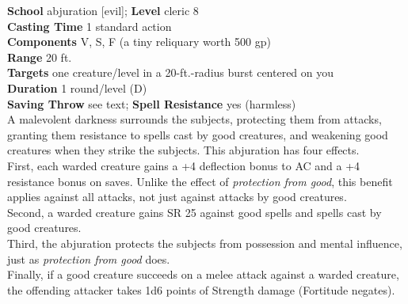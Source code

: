 \textbf{School} abjuration [evil]; \textbf{Level} cleric 8\\
\textbf{Casting Time} 1 standard action\\
\textbf{Components} V, S, F (a tiny reliquary worth 500 gp)\\
\textbf{Range} 20 ft.\\
\textbf{Targets} one creature/level in a 20-ft.-radius burst centered on you\\
\textbf{Duration} 1 round/level (D)\\
\textbf{Saving Throw} see text; \textbf{Spell Resistance} yes (harmless)\\
A malevolent darkness surrounds the subjects, protecting them from attacks, granting them resistance to spells cast by good creatures, and weakening good creatures when they strike the subjects. This abjuration has four effects.\\
First, each warded creature gains a +4 deflection bonus to AC and a +4 resistance bonus on saves. Unlike the effect of \textit{protection from good}, this benefit applies against all attacks, not just against attacks by good creatures.\\
Second, a warded creature gains SR 25 against good spells and spells cast by good creatures.\\
Third, the abjuration protects the subjects from possession and mental influence, just as \textit{protection from good }does.\\
Finally, if a good creature succeeds on a melee attack against a warded creature, the offending attacker takes 1d6 points of Strength damage (Fortitude negates).\\
